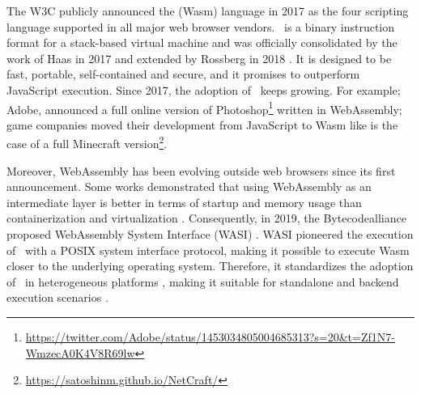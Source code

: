 \msection{\Wasm}
\label{sota:wasm}

The W3C publicly announced the \Wasm(Wasm) language in 2017 as the four scripting language supported in all major web browser vendors.
\wasm\ is a binary instruction format for a stack-based virtual machine and was officially consolidated by the work of Haas \etal \cite{Haas_2017} in 2017 and extended by Rossberg in 2018 \cite{10.1145/3282510}. 
It is designed to be fast, portable, self-contained and secure, and it promises to outperform JavaScript execution. 
Since 2017, the adoption of \wasm\ keeps growing. 
For example; Adobe, announced a full online version of Photoshop\footnote{\url{https://twitter.com/Adobe/status/1453034805004685313?s=20&t=Zf1N7-WmzecA0K4V8R69lw}} written in WebAssembly;  game companies moved their development from JavaScript to Wasm like is the case of a full Minecraft version\footnote{\url{https://satoshinm.github.io/NetCraft/}}. 

Moreover, WebAssembly has been evolving outside web browsers since its first announcement.
Some works demonstrated that using WebAssembly as an intermediate layer is better in terms of startup and memory usage than containerization and virtualization \cite{pMendkiServerless, 1244493Jacobsson}. 
Consequently, in 2019, the Bytecodealliance proposed WebAssembly System Interface (WASI) \cite{WASI}. 
WASI pioneered the execution of \wasm\ with a POSIX system interface protocol, making it possible to execute Wasm closer to the underlying operating system. 
Therefore, it standardizes the adoption of \wasm\ in heterogeneous platforms \cite{bryant2020webassembly}, making it suitable for standalone and backend execution scenarios \cite{9640153, wen2020wasmachine}.

